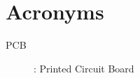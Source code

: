 \chapter*{Acronyms}

\begin{description}
	\item[PCB] : Printed Circuit Board

\end{description}

	
	